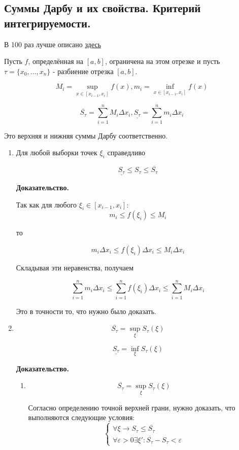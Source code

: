\documentclass[a4paper]{article}
\begin{document}
\begin{definit}
\hypertarget{p5}{}
\subsection*{Суммы Дарбу и их свойства. Критерий интегрируемости.}
В 100 раз лучше описано \href{https://univerlib.com/mathematical_analysis/definite_integral/definite_integral_def/}{здесь}

Пусть $f$, определённая на $[a,b]$, ограничена на этом отрезке и пусть $\tau = \{ x_0, ..., x_n\}$ - разбиение отрезка $[a,b]$.

\[
M_i = \sup_{x \in [x_{i-1}, x_i]} f(x), m_i = \inf_{x \in [x_{i-1}, x_i]} f(x)
\]

\[
\overline{S_\tau} = \sum_{i=1}^n M_i \Delta x_i, \underline{S_\tau} = \sum_{i=1}^n m_i \Delta x_i
\]

Это верхняя и нижняя суммы Дарбу соответственно.

\begin{enumerate}
\item Для любой выборки точек $\xi_i$ справедливо 

\[
\underline{S_\tau} \leq S_\tau \leq \overline{S_\tau}  
\]

\textbf{Доказательство.}

Так как для любого $\xi_i \in [x_{i-1}, x_i]$: 
\[
m_i \leq f(\xi_i) \leq M_i
\]

то

\[
m_i \Delta x_i \leq f(\xi_i) \Delta x_i \leq M_i \Delta x_i
\]

Складывая эти неравенства, получаем

\[
\sum_{i=1}^n m_i \Delta x_i \leq \sum_{i=1}^n f(\xi_i) \Delta x_i \leq \sum_{i=1}^n M_i \Delta x_i
\]

Это в точности то, что нужно было доказать.

\item \[\overline{S_\tau} = \sup_{\xi} S_\tau(\xi)\]

\[\underline{S_\tau} = \inf_{\xi} S_\tau(\xi)\]

\textbf{Доказательство.}
\begin{enumerate}
\item \[\overline{S_\tau} = \sup_{\xi} S_\tau(\xi)\]

Согласно определению точной верхней грани, нужно доказать, что выполняются следующие условия:
\[
\begin{cases}
\forall \xi \rightarrow S_\tau \leq \overline{S_\tau} \\ \forall \varepsilon > 0 \exists \xi': \overline{S_\tau} - S_\tau < \varepsilon
\end{cases}
\]


\end{enumerate}
\end{enumerate}
\end{definit}
\end{document}
